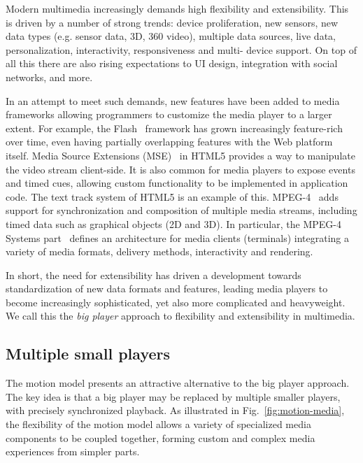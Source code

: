 Modern multimedia increasingly demands high flexibility and extensibility.
This is driven by a number of strong trends: device proliferation, new
sensors, new data types (e.g. sensor data, 3D, 360 video), multiple data
sources, live data, personalization, interactivity, responsiveness and multi-
device support. On top of all this there are also rising expectations to UI
design, integration with social networks, and more.

In an attempt to meet such demands, new features have been added to media
frameworks allowing programmers to customize the media player to a larger
extent. For example, the Flash~\cite{flash} framework has grown increasingly
feature-rich over time, even having partially overlapping features with the
Web platform itself. Media Source Extensions (MSE)~\cite{mse} in HTML5
provides a way to manipulate the video stream client-side. It is also common
for media players to expose events and timed cues, allowing custom
functionality to be implemented in application code. The text track system of
HTML5 is an example of this. MPEG-4~\cite{mpeg4} adds support for
synchronization and composition of multiple media streams, including timed data
such as graphical objects (2D and 3D). In particular, the MPEG-4 Systems
part~\cite{mpeg4sys} defines an architecture for media clients (terminals)
integrating a variety of media formats, delivery methods, interactivity and
rendering.

In short, the need for extensibility has driven a development towards
standardization of new data formats and features, leading media players to
become increasingly sophisticated, yet also more complicated and heavyweight.
We call this the \emph{big player} approach to flexibility and extensibility in
multimedia.


\subsection{Multiple small players}

The motion model presents an attractive alternative to the big player
approach. The key idea is that a big player may be replaced by multiple
smaller players, with precisely synchronized playback. As illustrated in
Fig.~\ref{fig:motion-media}, the flexibility of the motion model allows a
variety of specialized media components to be coupled together, forming custom
and complex media experiences from simpler parts.


